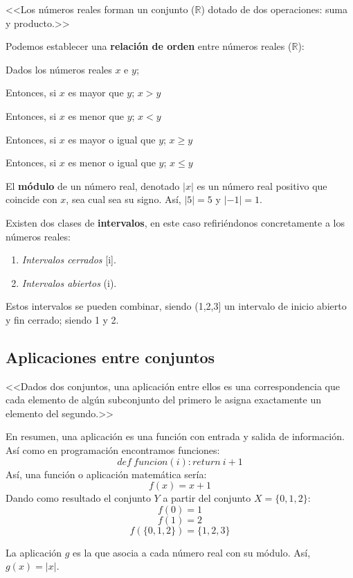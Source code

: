 \documentclass[11pt, oneside, titlepage]{article}
\begin{document}
<<Los números reales forman un conjunto ($\mathds{R}$) dotado de dos operaciones: suma y producto.>>

Podemos establecer una \textbf{relación de orden} entre números reales ($\mathds{R}$):

Dados los números reales $x$ e $y$;

Entonces, si $x$ es mayor que $y$; $x > y$

Entonces, si $x$ es menor que $y$; $x < y$

Entonces, si $x$ es mayor o igual que $y$; $x \geq y$

Entonces, si $x$ es menor o igual que $y$; $x \leq y$

El \textbf{módulo} de un número real, denotado $|x|$ es un número real positivo que coincide con $x$, sea cual sea su signo. Así, $|5| = 5$ y $|-1| = 1$.

Existen dos clases de \textbf{intervalos}, en este caso refiriéndonos concretamente a los números reales:
\begin{enumerate}
\item \emph{Intervalos cerrados} [i].
\item \emph{Intervalos abiertos} (i).
\end{enumerate}
Estos intervalos se pueden combinar, siendo (1,2,3] un intervalo de inicio abierto y fin cerrado; siendo 1 y 2.
\subsection{Aplicaciones entre conjuntos}
<<Dados dos conjuntos, una aplicación entre ellos es una correspondencia que cada elemento de algún subconjunto del primero le asigna exactamente un elemento del segundo.>>

En resumen, una aplicación es una función con entrada y salida de información. Así como en programación encontramos funciones:
\[
def\ funcion(i):
	return\ i+1
\]
Así, una función o aplicación matemática sería:
\[
f(x)=x+1
\]
Dando como resultado el conjunto $Y$ a partir del conjunto $X = \{0,1,2\}$:
\[
f(0) = 1
\]
\[
f(1) = 2
\]
\[
f(\{0, 1, 2\}) = \{1, 2, 3\}
\]

La aplicación $g$ es la que asocia a cada número real con su módulo. Así, $g(x)=|x|$.
\end{document}
